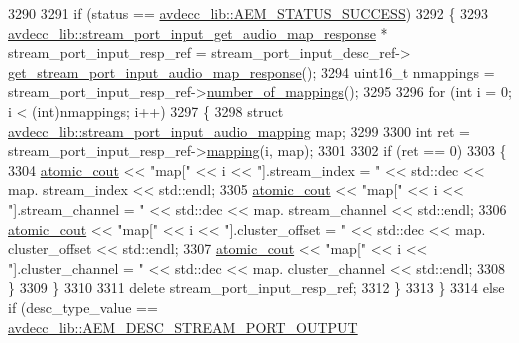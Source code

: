 \begin{DoxyCode}
3290 
3291         \textcolor{keywordflow}{if} (status == \hyperlink{namespaceavdecc__lib_affd436edb2cecd20cfd784a84f852b2bac947077909cb590b84f4b5db413080e0}{avdecc\_lib::AEM\_STATUS\_SUCCESS})
3292         \{
3293             \hyperlink{classavdecc__lib_1_1stream__port__input__get__audio__map__response}{avdecc\_lib::stream\_port\_input\_get\_audio\_map\_response}
       * stream\_port\_input\_resp\_ref = stream\_port\_input\_desc\_ref->
      \hyperlink{classavdecc__lib_1_1stream__port__input__descriptor_a5b79f01c24a0d25900ce351c21cfada3}{get\_stream\_port\_input\_audio\_map\_response}();
3294             uint16\_t nmappings = stream\_port\_input\_resp\_ref->\hyperlink{classavdecc__lib_1_1stream__port__input__get__audio__map__response_a7f2372b5389cf9ba04675f3ef37439f3}{number\_of\_mappings}();
3295 
3296             \textcolor{keywordflow}{for} (\textcolor{keywordtype}{int} i = 0; i < (int)nmappings; i++)
3297             \{
3298                 \textcolor{keyword}{struct }\hyperlink{structavdecc__lib_1_1stream__port__input__audio__mapping}{avdecc\_lib::stream\_port\_input\_audio\_mapping}
       map;
3299 
3300                 \textcolor{keywordtype}{int} ret = stream\_port\_input\_resp\_ref->\hyperlink{classavdecc__lib_1_1stream__port__input__get__audio__map__response_af3baf3e496f1553669459edbbf5b3fc0}{mapping}(i, map);
3301 
3302                 \textcolor{keywordflow}{if} (ret == 0)
3303                 \{
3304                     \hyperlink{cmd__line_8h_a0bc38ccc65c79ba06c6fcd7b4bf554c3}{atomic\_cout} << \textcolor{stringliteral}{"map["} << i << \textcolor{stringliteral}{"].stream\_index = "} << std::dec << map.
      stream\_index << std::endl;
3305                     \hyperlink{cmd__line_8h_a0bc38ccc65c79ba06c6fcd7b4bf554c3}{atomic\_cout} << \textcolor{stringliteral}{"map["} << i << \textcolor{stringliteral}{"].stream\_channel = "} << std::dec << map.
      stream\_channel << std::endl;
3306                     \hyperlink{cmd__line_8h_a0bc38ccc65c79ba06c6fcd7b4bf554c3}{atomic\_cout} << \textcolor{stringliteral}{"map["} << i << \textcolor{stringliteral}{"].cluster\_offset = "} << std::dec << map.
      cluster\_offset << std::endl;
3307                     \hyperlink{cmd__line_8h_a0bc38ccc65c79ba06c6fcd7b4bf554c3}{atomic\_cout} << \textcolor{stringliteral}{"map["} << i << \textcolor{stringliteral}{"].cluster\_channel = "} << std::dec << map.
      cluster\_channel << std::endl;
3308                 \}
3309             \}
3310 
3311             \textcolor{keyword}{delete} stream\_port\_input\_resp\_ref;
3312         \}
3313     \}
3314     \textcolor{keywordflow}{else} \textcolor{keywordflow}{if} (desc\_type\_value == \hyperlink{namespaceavdecc__lib_ac7b7d227e46bc72b63ee9e9aae15902fa2b2dca37bb2c945a2b37b02231650b48}{avdecc\_lib::AEM\_DESC\_STREAM\_PORT\_OUTPUT}

\end{DoxyCode}
